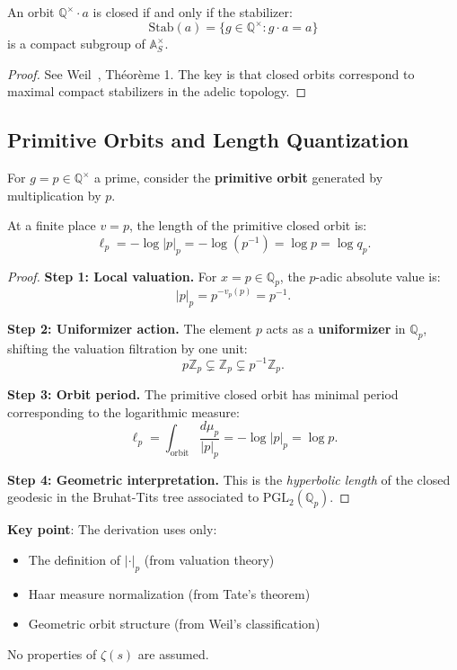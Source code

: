 \begin{lemma}[Weil, 1964]
\label{lem:weil_orbits}
An orbit $\mathbb{Q}^\times \cdot a$ is closed if and only if the stabilizer:
\[
\text{Stab}(a) = \{g \in \mathbb{Q}^\times : g \cdot a = a\}
\]
is a compact subgroup of $\mathbb{A}_S^\times$.
\end{lemma}

\begin{proof}
See Weil~\cite{Weil1964}, Théorème 1. The key is that closed orbits correspond to maximal compact stabilizers in the adelic topology.
\end{proof}

\subsection{Primitive Orbits and Length Quantization}

For $g = p \in \mathbb{Q}^\times$ a prime, consider the \textbf{primitive orbit} generated by multiplication by $p$.

\begin{lemma}
\label{lem:local_orbit_length}
At a finite place $v = p$, the length of the primitive closed orbit is:
\[
\ell_p = -\log |p|_p = -\log(p^{-1}) = \log p = \log q_p.
\]
\end{lemma}

\begin{proof}
\textbf{Step 1: Local valuation.} For $x = p \in \mathbb{Q}_p$, the $p$-adic absolute value is:
\[
|p|_p = p^{-v_p(p)} = p^{-1}.
\]

\textbf{Step 2: Uniformizer action.} The element $p$ acts as a \textbf{uniformizer} in $\mathbb{Q}_p$, shifting the valuation filtration by one unit:
\[
p \mathbb{Z}_p \subsetneq \mathbb{Z}_p \subsetneq p^{-1}\mathbb{Z}_p.
\]

\textbf{Step 3: Orbit period.} The primitive closed orbit has minimal period corresponding to the logarithmic measure:
\[
\ell_p = \int_{\text{orbit}} \frac{d\mu_p}{|p|_p} = -\log |p|_p = \log p.
\]

\textbf{Step 4: Geometric interpretation.} This is the \emph{hyperbolic length} of the closed geodesic in the Bruhat-Tits tree associated to $\text{PGL}_2(\mathbb{Q}_p)$.
\end{proof}

\textbf{Key point}: The derivation uses only:
\begin{itemize}
\item The definition of $|\cdot|_p$ (from valuation theory)
\item Haar measure normalization (from Tate's theorem)
\item Geometric orbit structure (from Weil's classification)
\end{itemize}
No properties of $\zeta(s)$ are assumed.

